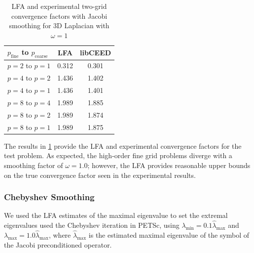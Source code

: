 \documentclass[review]{siamart190516}
\begin{document}
\begin{table}[ht!]
\begin{center}
\begin{tabular}{l c c}
  \toprule
  $p_{\text{fine}}$ to $p_{\text{coarse}}$  &  LFA  &  libCEED  \\
  \toprule
  $p = 2$ to $p = 1$   &  0.312  &  0.301  \\
  \midrule
  $p = 4$ to $p = 2$   &  1.436  &  1.402  \\
  $p = 4$ to $p = 1$   &  1.436  &  1.401  \\
  \midrule
  $p = 8$ to $p = 4$   &  1.989  &  1.885  \\
  $p = 8$ to $p = 2$   &  1.989  &  1.874  \\
  $p = 8$ to $p = 1$   &  1.989  &  1.875  \\
  \bottomrule
\end{tabular}
\end{center}
\caption{LFA and experimental two-grid convergence factors with Jacobi smoothing for 3D Laplacian with $\omega = 1$}
\label{table:two_grid_3d_jacobi}
\end{table}

The results in \cref{table:two_grid_3d_jacobi} provide the LFA and experimental convergence factors for the test problem.
As expected, the high-order fine grid problems diverge with a smoothing factor of $\omega = 1.0$; however, the LFA provides reasonable upper bounds on the true convergence factor seen in the experimental results.

\subsubsection{Chebyshev Smoothing}

We used the LFA estimates of the maximal eigenvalue to set the extremal eigenvalues used the Chebyshev iteration in PETSc, using $\lambda_{\text{min}} = 0.1 \hat{\lambda}_{\text{max}}$ and $\lambda_{\text{max}} = 1.0 \hat{\lambda}_{\text{max}}$, where $\hat{\lambda}_{\text{max}}$ is the estimated maximal eigenvalue of the symbol of the Jacobi preconditioned operator.
\end{document}
